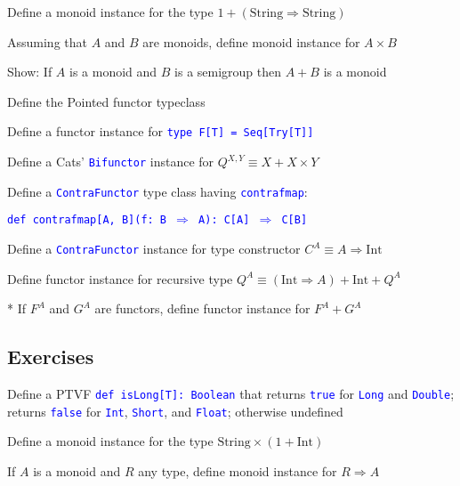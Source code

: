 Define a monoid instance for the type $1+\left(\text{String}\Rightarrow\text{String}\right)$

Assuming that $A$ and $B$ are monoids, define monoid instance for
$A\times B$

Show: If $A$ is a monoid and $B$ is a semigroup then $A+B$ is a
monoid

Define the Pointed functor typeclass

Define a functor instance for \texttt{\textcolor{blue}{\footnotesize{}type
F{[}T{]} = Seq{[}Try{[}T{]}{]}}}{\footnotesize\par}

Define a Cats' \texttt{\textcolor{blue}{\footnotesize{}Bifunctor}}
instance for $Q^{X,Y}\equiv X+X\times Y$

Define a \texttt{\textcolor{blue}{\footnotesize{}ContraFunctor}} type
class having \texttt{\textcolor{blue}{\footnotesize{}contrafmap}}:

\texttt{\textcolor{blue}{\footnotesize{}def contrafmap{[}A, B{]}(f: B
$\Rightarrow$ A): C{[}A{]} $\Rightarrow$ C{[}B{]}}}{\footnotesize\par}

Define a \texttt{\textcolor{blue}{\footnotesize{}ContraFunctor}} instance
for type constructor $C^{A}\equiv A\Rightarrow\text{Int}$

Define functor instance for recursive type $Q^{A}\equiv\left(\text{Int}\Rightarrow A\right)+\text{Int}+Q^{A}$

{*} If $F^{A}$ and $G^{A}$ are functors, define functor instance
for $F^{A}+G^{A}$


\subsection{Exercises}

Define a PTVF \texttt{\textcolor{blue}{\footnotesize{}def isLong{[}T{]}:\ Boolean}}
that returns \texttt{\textcolor{blue}{\footnotesize{}true}} for \texttt{\textcolor{blue}{\footnotesize{}Long}}
and \texttt{\textcolor{blue}{\footnotesize{}Double}}; returns \texttt{\textcolor{blue}{\footnotesize{}false}}
for \texttt{\textcolor{blue}{\footnotesize{}Int}}, \texttt{\textcolor{blue}{\footnotesize{}Short}},
and \texttt{\textcolor{blue}{\footnotesize{}Float}}; otherwise undefined

Define a monoid instance for the type $\text{String}\times(1+\text{Int})$

If $A$ is a monoid and $R$ any type, define monoid instance for
$R\Rightarrow A$

